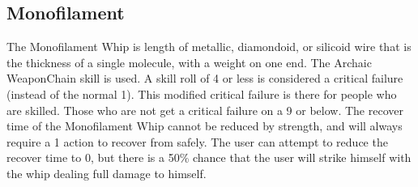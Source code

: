 \documentclass[twoside]{book}
\begin{document}
\vspace{1ex}
    
    

\subsection{Monofilament}
      The Monofilament Whip is length of metallic,
               diamondoid, or silicoid wire that is the thickness of a
               single molecule, with a weight on one end. The Archaic
               WeaponChain skill is used. A skill roll of 4 or
               less is considered a critical failure (instead of the
               normal 1). This modified critical failure is there for
               people who are skilled. Those who are not get a critical
               failure on a 9 or below.   The recover time of the Monofilament Whip cannot be
               reduced by strength, and will always require a 1 action to
               recover from safely. The user can attempt to reduce the
               recover time to 0, but there is a 50\% chance that the user
               will strike himself with the whip dealing full damage to
               himself. 
\end{document}

